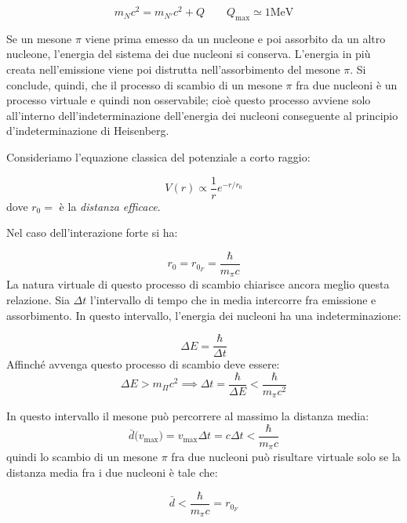 \begin{equation*} 
  m_N c^2 = m_{N'} c^2 + Q \qquad Q_\text{max} \simeq 1 \text{MeV}
\end{equation*}

Se un mesone $\pi$ viene prima emesso da un nucleone e poi assorbito da un altro
nucleone, l'energia del sistema dei due nucleoni si conserva. L'energia in più
creata nell'emissione viene poi distrutta nell'assorbimento del mesone $\pi$. Si
conclude, quindi, che il processo di scambio di un mesone $\pi$ fra due nucleoni
è un processo virtuale e quindi non osservabile; cioè questo processo avviene
solo all'interno dell'indeterminazione dell'energia dei nucleoni conseguente al
principio d'indeterminazione di Heisenberg.

Consideriamo l'equazione classica del potenziale a corto raggio:

\begin{equation*}
V(r) \propto \dfrac{1}{r} e^{-r/r_0}
\end{equation*}
dove $r_0 =$ è la \textit{distanza efficace}.

Nel caso dell'interazione forte si ha:

\begin{equation*}
r_0 = r_{0_{F}} = \dfrac{\hbar}{m_{\pi} c}
\end{equation*}
La natura virtuale di questo processo di scambio chiarisce ancora meglio questa 
relazione. 
Sia $\Delta t$ l'intervallo di tempo che in media intercorre fra emissione e
assorbimento. In questo intervallo, l'energia dei nucleoni ha una
indeterminazione:

\begin{equation*}
\Delta E = \dfrac{\hbar}{\Delta t}
\end{equation*}
Affinché avvenga questo processo di scambio deve essere:
\begin{equation*}
\Delta E > m_{\Pi} c^2  \implies \Delta t = \dfrac{\hbar}{\Delta E} < 
\dfrac{\hbar}{m_{\pi}c^2}
\end{equation*}

In questo intervallo il mesone può percorrere al massimo la distanza media:
\begin{equation*}
\bar{d} \bigl(v_\text{max} \bigr) = v_\text{max} \Delta t = c \Delta t < 
\dfrac{\hbar}{m_{\pi}c}
\end{equation*}
quindi lo scambio di un mesone $\pi$ fra due nucleoni può risultare virtuale
solo se la distanza media fra i due nucleoni è tale che:

\begin{equation*}
\bar{d} < \dfrac{\hbar}{m_{\pi}c} = r_{0_{F}}
\end{equation*}

